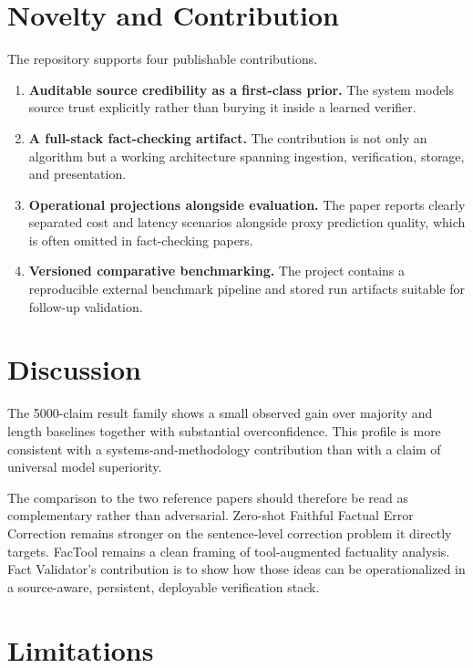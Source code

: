 \documentclass[conference]{IEEEtran}
\begin{document}
\section{Novelty and Contribution}

The repository supports four publishable contributions.

\begin{enumerate}
  \item \textbf{Auditable source credibility as a first-class prior.} The system models source trust explicitly rather than burying it inside a learned verifier.
  \item \textbf{A full-stack fact-checking artifact.} The contribution is not only an algorithm but a working architecture spanning ingestion, verification, storage, and presentation.
  \item \textbf{Operational projections alongside evaluation.} The paper reports clearly separated cost and latency scenarios alongside proxy prediction quality, which is often omitted in fact-checking papers.
  \item \textbf{Versioned comparative benchmarking.} The project contains a reproducible external benchmark pipeline and stored run artifacts suitable for follow-up validation.
\end{enumerate}

\section{Discussion}

The 5000-claim result family shows a small observed gain over majority and length baselines together with substantial overconfidence. This profile is more consistent with a systems-and-methodology contribution than with a claim of universal model superiority.

The comparison to the two reference papers should therefore be read as complementary rather than adversarial. Zero-shot Faithful Factual Error Correction remains stronger on the sentence-level correction problem it directly targets. FacTool remains a clean framing of tool-augmented factuality analysis. Fact Validator's contribution is to show how those ideas can be operationalized in a source-aware, persistent, deployable verification stack.

\section{Limitations}
\end{document}
